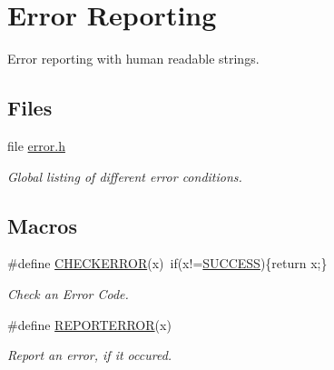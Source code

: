 \hypertarget{group__error}{\section{Error Reporting}
\label{group__error}
}


Error reporting with human readable strings.  


\subsection*{Files}
\begin{DoxyCompactItemize}
\item 
file \hyperlink{error_8h}{error.\-h}
\begin{DoxyCompactList}\small\item\em Global listing of different error conditions. \end{DoxyCompactList}\end{DoxyCompactItemize}
\subsection*{Macros}
\begin{DoxyCompactItemize}
\item 
\#define \hyperlink{group__error_ga27f0c01e2c2678a7a6c0c44f86108fe0}{C\-H\-E\-C\-K\-E\-R\-R\-O\-R}(x)~if(x!=\hyperlink{group__error_gga2c3e4bb40f36b262a5214e2da2bca9c5ac7f69f7c9e5aea9b8f54cf02870e2bf8}{S\-U\-C\-C\-E\-S\-S})\{return x;\}
\begin{DoxyCompactList}\small\item\em Check an Error Code. \end{DoxyCompactList}\item 
\#define \hyperlink{group__error_ga72d32a02ede7ed11eee387aa4f4c05d5}{R\-E\-P\-O\-R\-T\-E\-R\-R\-O\-R}(x)
\begin{DoxyCompactList}\small\item\em Report an error, if it occured. \end{DoxyCompactList}\end{DoxyCompactItemize}

